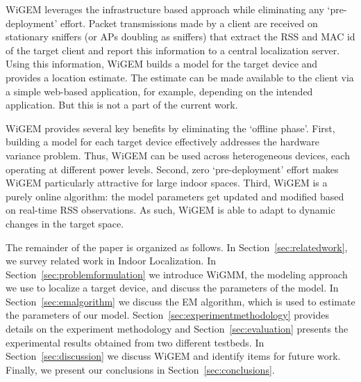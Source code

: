 WiGEM leverages the infrastructure based approach 
while eliminating any `pre-deployment' effort. Packet transmissions made by a client are received on stationary sniffers 
(or APs doubling as sniffers) that extract the RSS and MAC id of the target client and report this information to a 
central localization server. Using this information, WiGEM builds a model for the target device and provides 
a location estimate. The estimate can be made available to the client via a simple web-based
application,  for example, depending on the intended application. But this is not a part
of the current work. 



WiGEM provides several key benefits by eliminating the `offline phase'. First, building a model for each target device effectively addresses the hardware variance problem. Thus, WiGEM can be used across heterogeneous devices, each operating at different power levels.  Second, zero `pre-deployment' effort makes WiGEM particularly attractive for large indoor spaces. Third, WiGEM is a purely online algorithm: the model parameters get updated and modified based on real-time RSS observations. As such, WiGEM is able to adapt to dynamic changes in the target space.

The remainder of the paper is organized as follows. In Section~\ref{sec:relatedwork}, we survey related work in Indoor Localization. In Section~\ref{sec:problemformulation} we introduce WiGMM, the modeling approach we use to localize a target device, and discuss the parameters of the model. In Section~\ref{sec:emalgorithm} we discuss the EM algorithm, which is used to estimate the parameters of our model. Section~\ref{sec:experimentmethodology} provides details on the experiment methodology and Section~\ref{sec:evaluation} presents the experimental results obtained from two different testbeds. In Section~\ref{sec:discussion} we discuss WiGEM and identify items for future work. Finally, we present our conclusions in Section~\ref{sec:conclusions}.

